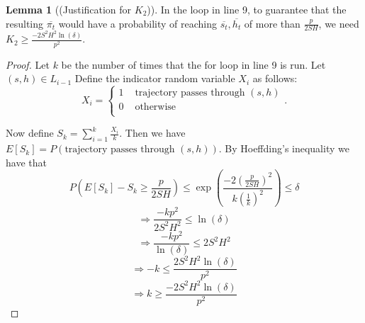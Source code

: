 \documentclass[12pt, letterpaper]{article}
\theoremstyle{definition}
\newtheorem*{lemma}{Lemma}
\theoremstyle{remark}
\begin{document}
\begin{lemma}[(Justification for \(K_2\))]
    In the loop in line 9, to guarantee that the resulting \(\overline{\pi_t}\) would have a probability of reaching \(\overline{s_t}, \overline{h_t}\) of more than \(\frac{p}{2SH}\), we need \(K_2 \geq \frac{-2S^2H^2 \ln(\delta)}{p^2}\).
\end{lemma}

\begin{proof}[Proof]
    Let \(k\) be the number of times that the for loop in line 9 is run. Let \((s, h) \in L_{i-1}\) Define the indicator random variable \(X_i\) as follows:
    \[X_i = \begin{cases}
        1 & \text{ trajectory passes through } (s, h) \\
        0 & \text{ otherwise } \\
    \end{cases}.\]

    Now define \(S_k = \sum_{i=1}^k \frac{X_i}{k}\). Then we have \(E[S_k] = P(\text{trajectory passes through } (s, h))\). By Hoeffding's inequality we have that
    \[P(E[S_k] - S_k \geq \frac{p}{2SH}) \leq \exp(\frac{-2(\frac{p}{2SH})^2}{k (\frac{1}{k})^2}) \leq \delta\]
    \[\Rightarrow \frac{-kp^2}{2S^2H^2} \leq \ln(\delta)\]
    \[\Rightarrow \frac{-kp^2}{\ln(\delta)} \leq 2S^2 H^2\]
    \[\Rightarrow -k \leq \frac{2S^2H^2 \ln(\delta)}{p^2}\]
    \[\Rightarrow k \geq \frac{-2S^2H^2 \ln(\delta)}{p^2}\]
\end{proof}
\end{document}
